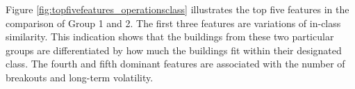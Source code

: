 Figure \ref{fig:topfivefeatures_operationsclass} illustrates the top five features in the comparison of Group 1 and 2. The first three features are variations of in-class similarity. This indication shows that the buildings from these two particular groups are differentiated by how much the buildings fit within their designated class. The fourth and fifth dominant features are associated with the number of breakouts and long-term volatility.